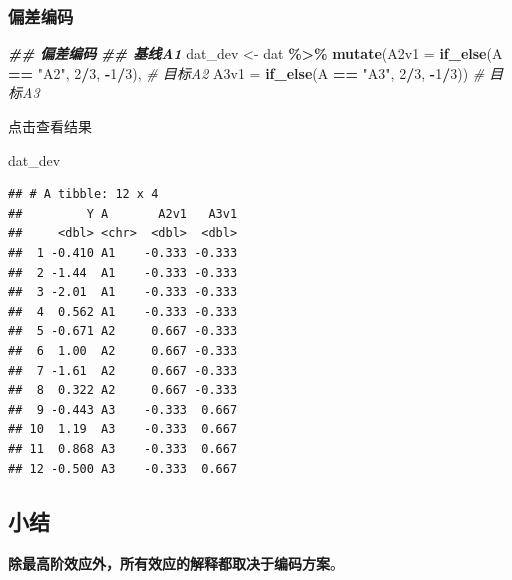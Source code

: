 \documentclass[
]{book}
\newenvironment{Shaded}{\begin{snugshade}}{\end{snugshade}}
\newcommand{\AttributeTok}[1]{\textcolor[rgb]{0.13,0.29,0.53}{#1}}
\newcommand{\CommentTok}[1]{\textcolor[rgb]{0.56,0.35,0.01}{\textit{#1}}}
\newcommand{\DecValTok}[1]{\textcolor[rgb]{0.00,0.00,0.81}{#1}}
\newcommand{\DocumentationTok}[1]{\textcolor[rgb]{0.56,0.35,0.01}{\textbf{\textit{#1}}}}
\newcommand{\FunctionTok}[1]{\textcolor[rgb]{0.13,0.29,0.53}{\textbf{#1}}}
\newcommand{\NormalTok}[1]{#1}
\newcommand{\OtherTok}[1]{\textcolor[rgb]{0.56,0.35,0.01}{#1}}
\newcommand{\SpecialCharTok}[1]{\textcolor[rgb]{0.81,0.36,0.00}{\textbf{#1}}}
\newcommand{\StringTok}[1]{\textcolor[rgb]{0.31,0.60,0.02}{#1}}
\begin{document}
\hypertarget{ux504fux5deeux7f16ux7801-2}{%
\subsubsection{偏差编码}\label{ux504fux5deeux7f16ux7801-2}}

\begin{Shaded}
\begin{Highlighting}[]
\DocumentationTok{\#\# 偏差编码}
\DocumentationTok{\#\# 基线A1}
\NormalTok{dat\_dev }\OtherTok{\textless{}{-}}\NormalTok{ dat }\SpecialCharTok{\%\textgreater{}\%}
  \FunctionTok{mutate}\NormalTok{(}\AttributeTok{A2v1 =} \FunctionTok{if\_else}\NormalTok{(A }\SpecialCharTok{==} \StringTok{"A2"}\NormalTok{, }\DecValTok{2}\SpecialCharTok{/}\DecValTok{3}\NormalTok{, }\SpecialCharTok{{-}}\DecValTok{1}\SpecialCharTok{/}\DecValTok{3}\NormalTok{), }\CommentTok{\# 目标A2}
         \AttributeTok{A3v1 =} \FunctionTok{if\_else}\NormalTok{(A }\SpecialCharTok{==} \StringTok{"A3"}\NormalTok{, }\DecValTok{2}\SpecialCharTok{/}\DecValTok{3}\NormalTok{, }\SpecialCharTok{{-}}\DecValTok{1}\SpecialCharTok{/}\DecValTok{3}\NormalTok{)) }\CommentTok{\# 目标A3}
\end{Highlighting}
\end{Shaded}

点击查看结果

\begin{Shaded}
\begin{Highlighting}[]
\NormalTok{dat\_dev}
\end{Highlighting}
\end{Shaded}

\begin{verbatim}
## # A tibble: 12 x 4
##         Y A       A2v1   A3v1
##     <dbl> <chr>  <dbl>  <dbl>
##  1 -0.410 A1    -0.333 -0.333
##  2 -1.44  A1    -0.333 -0.333
##  3 -2.01  A1    -0.333 -0.333
##  4  0.562 A1    -0.333 -0.333
##  5 -0.671 A2     0.667 -0.333
##  6  1.00  A2     0.667 -0.333
##  7 -1.61  A2     0.667 -0.333
##  8  0.322 A2     0.667 -0.333
##  9 -0.443 A3    -0.333  0.667
## 10  1.19  A3    -0.333  0.667
## 11  0.868 A3    -0.333  0.667
## 12 -0.500 A3    -0.333  0.667
\end{verbatim}

\hypertarget{ux5c0fux7ed3}{%
\subsection{小结}\label{ux5c0fux7ed3}}

\textbf{除最高阶效应外，所有效应的解释都取决于编码方案}。
\end{document}
